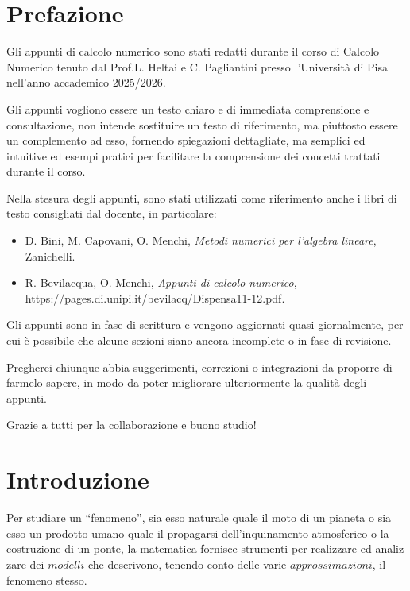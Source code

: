 \documentclass[10pt]{styles}
\subtitle[:]{Università di Pisa - Ingegneria dell'energia AA 25/26}
\begin{document}

\contenttable  %

\mainmatter  %

\chapter*{Prefazione}
Gli appunti di calcolo numerico sono stati redatti durante il corso di Calcolo Numerico tenuto dal Prof.L. Heltai e C. Pagliantini  presso l'Università di Pisa nell'anno accademico 2025/2026.

Gli appunti vogliono essere un testo chiaro e di immediata comprensione e consultazione, non intende sostituire un testo di riferimento, 
ma piuttosto essere un complemento ad esso, fornendo spiegazioni dettagliate, ma semplici ed intuitive ed esempi pratici per facilitare la comprensione dei concetti trattati durante il corso.

Nella stesura degli appunti, sono stati utilizzati come riferimento anche i libri di testo consigliati dal docente, in particolare:
\begin{itemize}
	\item D. Bini, M. Capovani, O. Menchi, \textit{Metodi numerici per l'algebra lineare}, Zanichelli.
	\item R. Bevilacqua, O. Menchi, \textit{Appunti di calcolo numerico},\\
    https://pages.di.unipi.it/bevilacq/Dispensa11-12.pdf.
\end{itemize}

Gli appunti sono in fase di scrittura e vengono aggiornati quasi giornalmente, per cui è possibile che alcune sezioni siano ancora incomplete o in fase di revisione.

Pregherei chiunque abbia suggerimenti, correzioni o integrazioni da proporre di farmelo sapere, in modo da poter migliorare ulteriormente la qualità degli appunti.

Grazie a tutti per la collaborazione e buono studio!

\clearpage

\chapter*{Introduzione}
Per studiare un “fenomeno”, sia esso naturale quale il moto di un pianeta o sia
esso un prodotto umano quale il propagarsi dell'inquinamento atmosferico o la
costruzione di un ponte, la matematica fornisce strumenti per realizzare ed analiz
zare dei $modelli$ che descrivono, tenendo conto delle varie $approssimazioni$, il fenomeno stesso.
\end{document}
